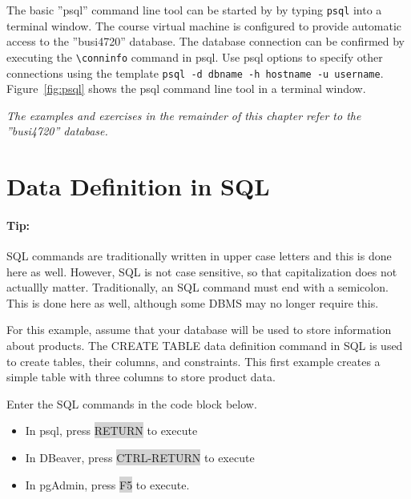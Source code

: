The basic ''psql'' command line tool can be started by by typing \texttt{psql} into a terminal window. The course virtual machine is configured to provide automatic access to the ''busi4720'' database. The database connection can be confirmed by executing the \texttt{\textbackslash conninfo} command in psql. Use psql options to specify other connections using the template \texttt{psql -d dbname -h hostname -u username}. Figure~\ref{fig:psql} shows the psql command line tool in a terminal window.

\begin{tcolorbox}[colback=alert]
\noindent \emph{The examples and exercises in the remainder of this chapter refer to the ''busi4720'' database.}
\end{tcolorbox}

\section{Data Definition in SQL}

\begin{tcolorbox}[colback=code]
\paragraph*{Tip:} SQL commands are traditionally written in upper case letters and this is done here as well. However, SQL is not case sensitive, so that capitalization does not actuallly matter. Traditionally, an SQL command must end with a semicolon. This is done here as well, although some DBMS may no longer require this. 
\end{tcolorbox}

For this example, assume that your database will be used to store information about products. The CREATE TABLE data definition command in SQL is used to create tables, their columns, and constraints. This first example creates a simple table with three columns to store product data.

\begin{tcolorbox}[colback=code]
Enter the SQL commands in the code block below.
\begin{itemize}
   \item In psql, press \colorbox{lightgray}{RETURN} to execute
   \item In DBeaver, press \colorbox{lightgray}{CTRL-RETURN} to execute
   \item In pgAdmin, press \colorbox{lightgray}{F5} to execute.
\end{itemize}
\end{tcolorbox}


